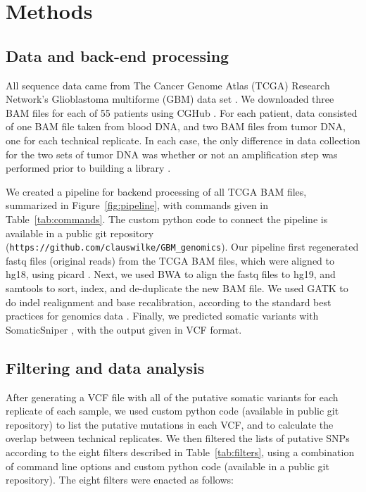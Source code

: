 \documentclass[11pt]{article} %
\begin{document}
\section*{Methods}

\subsection*{Data and back-end processing}

All sequence data came from The Cancer Genome Atlas (TCGA) Research Network's Glioblastoma multiforme (GBM) data set \citep{TCGA-GBM}. We downloaded three BAM files for each of 55 patients using CGHub \citep{CGHub}. For each patient, data consisted of one BAM file taken from blood DNA, and two BAM files from tumor DNA, one for each technical replicate. In each case, the only difference in data collection for the two sets of tumor DNA was whether or not an amplification step was performed prior to building a library \citep{TCGA-GBM}. 

We created a pipeline for backend processing of all TCGA BAM files, summarized in Figure~\ref{fig:pipeline}, with commands given in Table~\ref{tab:commands}. The custom python code to connect the pipeline is available in a public 
git repository (\texttt{https://github.com/clauswilke/GBM\_genomics}). Our pipeline first regenerated fastq files (original reads) from the TCGA BAM files, which were aligned to hg18, using picard \citep{picard}. Next, we used BWA \citep{bwa} to align the fastq files to hg19, and samtools \citep{SAMtools} to sort, index, and de-duplicate the new BAM file. We used GATK \citep{GATK} to do indel realignment and base recalibration, according to the standard best practices for genomics data \citep{best-practices}. Finally, we predicted somatic variants with SomaticSniper \citep{SomaticSniper}, with the output given in VCF format.

\subsection*{Filtering and data analysis}

After generating a VCF file with all of the putative somatic variants for each replicate of each sample, we used custom python code (available in public git repository) to list the putative mutations in each VCF, and to calculate the overlap between technical replicates. We then filtered the lists of putative SNPs according to the eight filters described in Table~\ref{tab:filters}, using a combination of command line options and custom python code (available in a public git repository). The eight filters were enacted as follows: 
\end{document}
